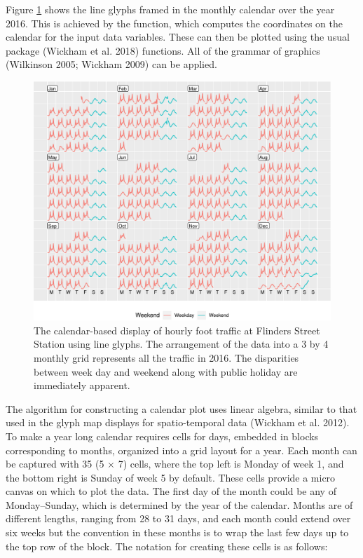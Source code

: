 \label{sec:algorithm}

Figure \ref{fig:flinders-2016} shows the line glyphs framed in the
monthly calendar over the year 2016. This is achieved by the
 function, which computes the coordinates on the
calendar for the input data variables. These can then be plotted using
the usual  package (Wickham et al. 2018) functions. All of
the grammar of graphics (Wilkinson 2005; Wickham 2009) can be applied.

\begin{Schunk}
\begin{figure}

{\centering \includegraphics[width=\textwidth]{figure/flinders-2016-1} 

}

\caption[The calendar-based display of hourly foot traffic at Flinders Street Station using line glyphs]{The calendar-based display of hourly foot traffic at Flinders Street Station using line glyphs. The arrangement of the data into a 3 by 4 monthly grid represents all the traffic in 2016. The disparities between week day and weekend along with public holiday are immediately apparent.}\label{fig:flinders-2016}
\end{figure}
\end{Schunk}

The algorithm for constructing a calendar plot uses linear algebra,
similar to that used in the glyph map displays for spatio-temporal data
(Wickham et al. 2012). To make a year long calendar requires cells for
days, embedded in blocks corresponding to months, organized into a grid
layout for a year. Each month can be captured with 35 (5 \(\times\) 7)
cells, where the top left is Monday of week 1, and the bottom right is
Sunday of week 5 by default. These cells provide a micro canvas on which
to plot the data. The first day of the month could be any of
Monday--Sunday, which is determined by the year of the calendar. Months
are of different lengths, ranging from 28 to 31 days, and each month
could extend over six weeks but the convention in these months is to
wrap the last few days up to the top row of the block. The notation for
creating these cells is as follows:

